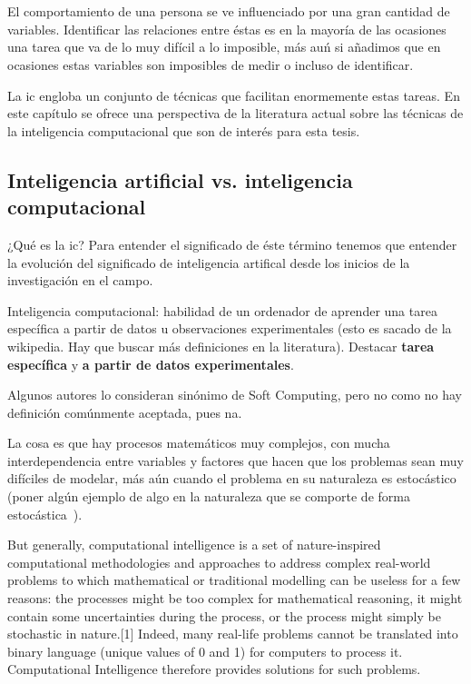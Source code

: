 \chapter{}
\label{ch:sota-ic}

El comportamiento de una persona se ve influenciado por una gran cantidad de variables. Identificar las relaciones entre éstas es en la mayoría de las ocasiones una tarea que va de lo muy difícil a lo imposible, más auń si añadimos que en ocasiones estas variables son imposibles de medir o incluso de identificar.

La \gls{ic} engloba un conjunto de técnicas que facilitan enormemente estas tareas. En este capítulo se ofrece una perspectiva de la literatura actual sobre las técnicas de la inteligencia computacional que son de interés para esta tesis.

\section{Inteligencia artificial vs. inteligencia computacional}

¿Qué es la \gls{ic}? Para entender el significado de éste término tenemos que entender la evolución del significado de inteligencia artifical desde los inicios de la investigación en el campo.

Inteligencia computacional: habilidad de un ordenador de aprender una tarea específica a partir de datos u observaciones experimentales (esto es sacado de la wikipedia. Hay que buscar más definiciones en la literatura). Destacar \textbf{tarea específica} y \textbf{a partir de datos experimentales}.

Algunos autores lo consideran sinónimo de Soft Computing, pero no como no hay definición comúnmente aceptada, pues na.

La cosa es que hay procesos matemáticos muy complejos, con mucha interdependencia entre variables y factores que hacen que los problemas sean muy difíciles de modelar, más aún cuando el problema en su naturaleza es estocástico (poner algún ejemplo de algo en la naturaleza que se comporte de forma estocástica~\cite{siddique2013computational}).

But generally, computational intelligence is a set of nature-inspired computational methodologies and approaches to address complex real-world problems to which mathematical or traditional modelling can be useless for a few reasons: the processes might be too complex for mathematical reasoning, it might contain some uncertainties during the process, or the process might simply be stochastic in nature.[1] Indeed, many real-life problems cannot be translated into binary language (unique values of 0 and 1) for computers to process it. Computational Intelligence therefore provides solutions for such problems.



